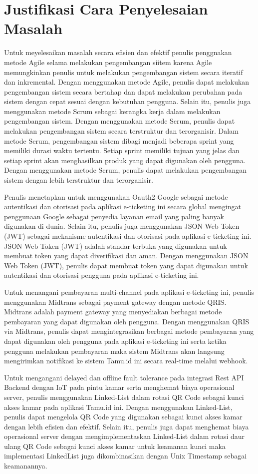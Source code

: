 \section{Justifikasi Cara Penyelesaian Masalah}

Untuk meyelesaikan masalah secara efisien dan efektif penulis penggnakan metode Agile selama melakukan pengembangan siitem karena Agile memungkinkan penulis untuk melakukan pengembangan sistem secara iteratif dan inkremental. Dengan menggunakan metode Agile, penulis dapat melakukan pengembangan sistem secara bertahap dan dapat melakukan perubahan pada sistem dengan cepat sesuai dengan kebutuhan pengguna. Selain itu, penulis juga menggunakan metode Scrum sebagai kerangka kerja dalam melakukan pengembangan sistem. Dengan menggunakan metode Scrum, penulis dapat melakukan pengembangan sistem secara terstruktur dan terorganisir. Dalam metode Scrum, pengembangan sistem dibagi menjadi beberapa sprint yang memiliki durasi waktu tertentu. Setiap sprint memiliki tujuan yang jelas dan setiap sprint akan menghasilkan produk yang dapat digunakan oleh pengguna. Dengan menggunakan metode Scrum, penulis dapat melakukan pengembangan sistem dengan lebih terstruktur dan terorganisir.

Penulis menetapkan untuk menggunakan Oauth2 Google sebagai metode autentikasi dan otorisasi pada aplikasi e-ticketing ini secara global mengingat penggunaan Google sebagai penyedia layanan email yang paling banyak digunakan di dunia. Selain itu, penulis juga menggunakan JSON Web Token (JWT) sebagai mekanisme autentikasi dan otorisasi pada aplikasi e-ticketing ini. JSON Web Token (JWT) adalah standar terbuka yang digunakan untuk membuat token yang dapat diverifikasi dan aman. Dengan menggunakan JSON Web Token (JWT), penulis dapat membuat token yang dapat digunakan untuk autentikasi dan otorisasi pengguna pada aplikasi e-ticketing ini.

Untuk menangani pembayaran multi-channel pada aplikasi e-ticketing ini, penulis menggunakan Midtrans sebagai payment gateway dengan metode QRIS. Midtrans adalah payment gateway yang menyediakan berbagai metode pembayaran yang dapat digunakan oleh pengguna. Dengan menggunakan QRIS via Midtrans, penulis dapat mengintegrasikan berbagai metode pembayaran yang dapat digunakan oleh pengguna pada aplikasi e-ticketing ini serta ketika pengguna melakukan pembayaran maka sistem Midtrans akan langsung mengirimkan notifikasi ke sistem Tamu.id ini secara real-time melalui webhook.

Untuk mengangani delayed dan offline fault tolerance pada integrasi Rest API Backend dengan IoT pada pintu kamar serta menghemat biaya operasional server, penulis menggunakan Linked-List dalam rotasi QR Code sebagai kunci akses kamar pada aplikasi Tamu.id ini. Dengan menggunakan Linked-List, penulis dapat mengelola QR Code yang digunakan sebagai kunci akses kamar dengan lebih efisien dan efektif. Selain itu, penulis juga dapat menghemat biaya operasional server dengan mengimplementaskan Linked-List dalam rotasi daur ulang QR Code sebagai kunci akses kamar untuk keamanan kunci maka implementasi LinkedList juga dikombinasikan dengan Unix Timestamp sebagai keamanannya.

